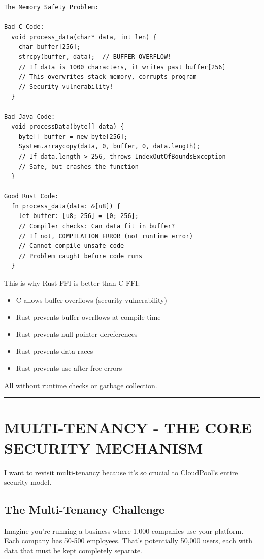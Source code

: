 \documentclass[11pt,a4paper]{report}
\begin{document}
\begin{lstlisting}[language=text]
The Memory Safety Problem:

Bad C Code:
  void process_data(char* data, int len) {
    char buffer[256];
    strcpy(buffer, data);  // BUFFER OVERFLOW!
    // If data is 1000 characters, it writes past buffer[256]
    // This overwrites stack memory, corrupts program
    // Security vulnerability!
  }

Bad Java Code:
  void processData(byte[] data) {
    byte[] buffer = new byte[256];
    System.arraycopy(data, 0, buffer, 0, data.length);
    // If data.length > 256, throws IndexOutOfBoundsException
    // Safe, but crashes the function
  }

Good Rust Code:
  fn process_data(data: &[u8]) {
    let buffer: [u8; 256] = [0; 256];
    // Compiler checks: Can data fit in buffer?
    // If not, COMPILATION ERROR (not runtime error)
    // Cannot compile unsafe code
    // Problem caught before code runs
  }
\end{lstlisting}

This is why Rust FFI is better than C FFI:
\begin{itemize}
\item C allows buffer overflows (security vulnerability)
\item Rust prevents buffer overflows at compile time
\item Rust prevents null pointer dereferences
\item Rust prevents data races
\item Rust prevents use-after-free errors

\end{itemize}
All without runtime checks or garbage collection.


\vfill\hrule\vfill



\part{MULTI-TENANCY - THE CORE SECURITY MECHANISM}


I want to revisit multi-tenancy because it's so crucial to CloudPool's entire security model.


\chapter{The Multi-Tenancy Challenge}


Imagine you're running a business where 1,000 companies use your platform. Each company has 50-500 employees. That's potentially 50,000 users, each with data that must be kept completely separate.
\end{document}
